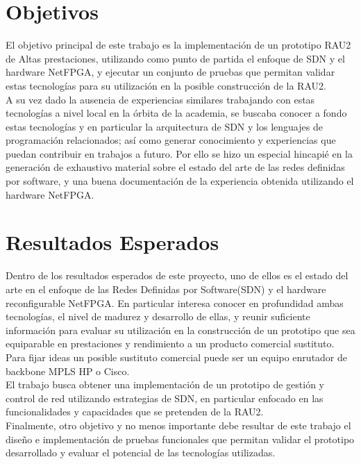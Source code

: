 \section{Objetivos}
El objetivo principal de este trabajo es la implementación de un prototipo RAU2 de Altas prestaciones, utilizando como punto de partida el enfoque de SDN y el hardware NetFPGA, y ejecutar un conjunto de pruebas que permitan validar estas tecnologías para su utilización en  la posible construcción de la RAU2.\\

A su vez dado la ausencia de experiencias similares  trabajando con estas tecnologías a nivel local en la órbita de la academia, se buscaba conocer a fondo estas tecnologías y en particular la arquitectura de SDN y los lenguajes de programación relacionados;  así como generar conocimiento y experiencias que puedan contribuir en trabajos a futuro. Por ello se hizo un especial hincapié en la generación de exhaustivo material sobre el estado del arte de las redes definidas por software, y una buena documentación de la experiencia obtenida utilizando el hardware NetFPGA.

\section{Resultados Esperados}
Dentro de los resultados esperados de este proyecto, uno de ellos es el estado del arte en el enfoque de las Redes Definidas por Software(SDN) y el hardware reconfigurable NetFPGA. En particular interesa conocer en profundidad ambas tecnologías, el nivel de madurez y desarrollo de ellas, y reunir suficiente información para evaluar su utilización en la construcción de un prototipo que sea equiparable en prestaciones y rendimiento a un producto comercial sustituto. Para fijar ideas un posible sustituto comercial puede ser un equipo enrutador de backbone MPLS HP o Cisco.\\
                   
El trabajo busca obtener una implementación de un prototipo de gestión y control de red utilizando estrategias de SDN, en particular enfocado en las funcionalidades y capacidades que se pretenden de la RAU2.\\

Finalmente, otro objetivo y no menos importante debe resultar de este trabajo el diseño e implementación de pruebas funcionales que permitan validar el prototipo desarrollado y evaluar el potencial de las tecnologías utilizadas.

